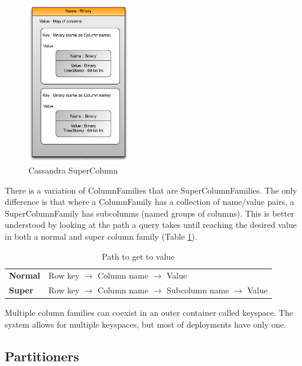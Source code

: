 \begin{figure}[htb]
  \begin{center}
    \leavevmode
    \includegraphics[width=0.4\textwidth]{images/supercolumn}
  \end{center}
  \caption{Cassandra SuperColumn}
  \label{fig:supercolumn}
\end{figure}

There is a variation of ColumnFamilies that are SuperColumnFamilies. The only difference is that where a ColumnFamily has a collection of name/value pairs, a SuperColumnFamily has subcolumns (named groups of columns). This is better understood by looking at the path a query takes until reaching the desired value in both a normal and super column family (Table \ref{tab:path}).

\begin{table}[h!]
\centering
  \begin{tabular}{ l | l }
	\hline \hline
	\textbf{Normal} & Row key $\rightarrow$ Column name $\rightarrow$ Value\\
    \textbf{Super}  & Row key $\rightarrow$ Column name $\rightarrow$ Subcolumn name $\rightarrow$ Value\\
    \hline \hline
  \end{tabular}

\caption{Path to get to value}
\label{tab:path}
\end{table}

Multiple column families can coexist in an outer container called keyspace. The system allows for multiple keyspaces, but most of deployments have only one.

\subsection{Partitioners}
\label{sec:partitioners}

